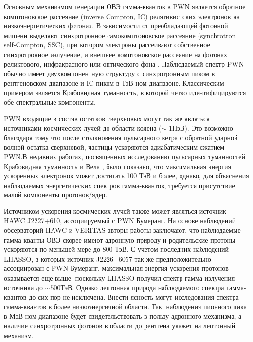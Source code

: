 Основным механизмом генерации ОВЭ гамма-квантов в PWN является обратное комптоновское рассеяние (inverse Compton, IC) релятивистских электронов на низкоэнергетических фотонах. В зависимости от преобладающей фотонной мишени выделяют синхротронное самокомптоновское рассеяние (synchrotron self-Compton, SSC), при котором электроны рассеивают собственное синхротронное излучение, и внешнее комптоновское рассеяние на фотонах реликтового, инфракрасного или оптического фона  \cite{Gaensler_2006}. Наблюдаемый спектр PWN обычно имеет двухкомпонентную структуру с синхротронным пиком в рентгеновском диапазоне и IC пиком в ТэВ-ном диапазоне. Классическим примером является Крабовидная туманность, в которой четко идентифицируются обе спектральные компоненты.
 
PWN входящие в состав остатков сверхновых могут так же являться источниками космических лучей до области колена ($\sim$ 1ПэВ). Это возможно благодаря тому что после столкновения пульсарного ветра с обратной ударной волной остатка сверхновой, частицы ускоряются адиабатическим сжатием PWN\cite{PWN_cr_source}.В недавних работах, посвященных исследованию пульсарных туманностей Крабовидная туманность \cite{Crab_PeV} и Вела \cite{Vela_HESS_Suzaku}, было показано, что максимальная энергия ускоренных электронов может достигать 100 ТэВ и более, однако, для объяснения наблюдаемых энергетических спектров гамма-квантов, требуется присутствие малой компоненты протонов/ядер.

Источником ускорения космических лучей также может являться источник HAWC J2227+610, ассоциируемый с PWN Бумеранг. На основе наблюдений обсерваторий HAWC и VERITAS авторы работы \cite{HAWC_Boomerang} заключают, что наблюдаемые гамма-кванты ОВЭ скорее имеют адронную природу и родительские протоны ускоряются по меньшей мере до 800 ТэВ. С учетом последних наблюдений LHASSO\cite{LHASSO_NATURE}, в которых источник J2226+6057 так же предположительно ассоциирован с PWN Бумеранг, максимальная энергия ускорения протонов оказывается еще выше, поскольку LHASSO получил спектр гамма-излучения источника до $\sim500$ТэВ. Однако лептонная природа наблюдаемого спектра гамма-квантов до сих пор не исключена. Внести ясность могут исследования спектра гамма-квантов в более низкоэнергичной области. Так, наблюдения пионного пика в МэВ-ном диапазоне будет свидетельствовать в пользу адронного механизма, а наличие синхротронных фотонов в области до рентгена укажет на лептонный механизм. 

